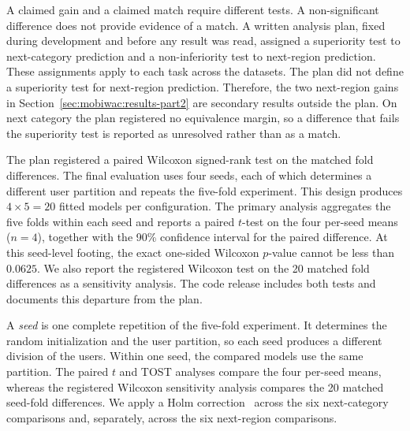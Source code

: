 A claimed gain and a claimed match require different tests. A non-significant difference does not provide evidence of a match. A written analysis plan, fixed during development and before any result was read, assigned a superiority test to next-category prediction and a non-inferiority test to next-region prediction. These assignments apply to each task across the datasets. The plan did not define a superiority test for next-region prediction. Therefore, the two next-region gains in Section~\ref{sec:mobiwac:results-part2} are secondary results outside the plan. On next category the plan registered no equivalence margin, so a difference that fails the superiority test is reported as unresolved rather than as a match.

The plan registered a paired Wilcoxon signed-rank test on the matched fold differences. The final evaluation uses four seeds, each of which determines a different user partition and repeats the five-fold experiment. This design produces $4\times5=20$ fitted models per configuration. The primary analysis aggregates the five folds within each seed and reports a paired $t$-test on the four per-seed means ($n{=}4$), together with the 90\% confidence interval for the paired difference. At this seed-level footing, the exact one-sided Wilcoxon $p$-value cannot be less than $0.0625$. We also report the registered Wilcoxon test on the 20 matched fold differences as a sensitivity analysis. The code release includes both tests and documents this departure from the plan.

A \emph{seed} is one complete repetition of the five-fold experiment. It determines the random initialization and the user partition, so each seed produces a different division of the users. Within one seed, the compared models use the same partition. The paired $t$ and TOST analyses compare the four per-seed means, whereas the registered Wilcoxon sensitivity analysis compares the 20 matched seed-fold differences. We apply a Holm correction~\cite{holm1979} across the six next-category comparisons and, separately, across the six next-region comparisons.

